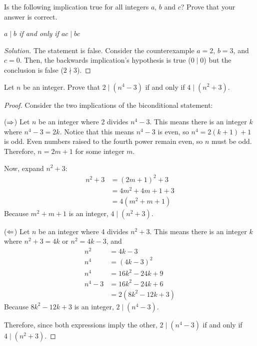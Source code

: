 \question Is the following implication true for all integers $a$, $b$ and $c$? Prove that your answer is correct.
\begin{center}
  \emph{$a \mid b$ if and only if $ac \mid bc$}
\end{center}
\begin{proof}[Solution]
  The statement is false.
  Consider the counterexample $a=2$, $b=3$, and $c=0$.
  Then, the backwards implication's hypothesis is true ($0 \mid 0$) but the conclusion is false ($2 \nmid 3$).
\end{proof}


\question Let $n$ be an integer. Prove that $2 \mid (n^4 - 3)$ if and only if $4 \mid (n^2 + 3)$.
\begin{proof}
  Consider the two implications of the biconditional statement:

  ($\Rightarrow$) Let $n$ be an integer where 2 divides $n^4 - 3$.
  This means there is an integer $k$ where $n^4-3 = 2k$.
  Notice that this means $n^4-3$ is even, so $n^4=2(k+1)+1$ is odd.
  Even numbers raised to the fourth power remain even, so $n$ must be odd.
  Therefore, $n = 2m+1$ for some integer $m$.

  Now, expand $n^2+3$:
  \begin{align*}
    n^2 + 3 & = (2m+1)^2 + 3      \\
            & = 4m^2 + 4m + 1 + 3 \\
            & = 4(m^2 + m + 1)
  \end{align*}
  Because $m^2 + m + 1$ is an integer, $4 \mid (n^2 + 3)$.

  ($\Leftarrow$) Let $n$ be an integer where 4 divides $n^2 + 3$.
  This means there is an integer $k$ where $n^2 + 3 = 4k$ or $n^2 = 4k-3$, and
  \begin{align*}
    n^2     & = 4k-3              \\
    n^4     & = (4k-3)^2          \\
    n^4     & = 16k^2 - 24k + 9   \\
    n^4 - 3 & = 16k^2 - 24k + 6   \\
            & = 2(8k^2 - 12k + 3)
  \end{align*}
  Because $8k^2 - 12k + 3$ is an integer, $2 \mid (n^4 - 3)$.

  Therefore, since both expressions imply the other, $2 \mid (n^4 - 3)$ if and only if $4 \mid (n^2 + 3)$.
\end{proof}



